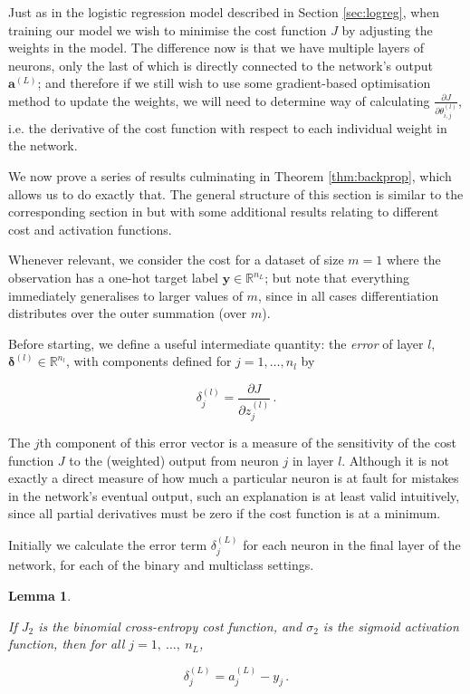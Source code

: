 \documentclass{article}[11pt]
\newtheorem{lemma}{Lemma}
\begin{document}
        Just as in the logistic regression model described in Section \ref{sec:logreg}, when training our model we wish to minimise the cost function $J$ by adjusting the weights in the model. The difference now is that we have multiple layers of neurons, only the last of which is directly connected to the network's output $\mathbf{a}^{(L)}$; and therefore if we still wish to use some gradient-based optimisation method to update the weights, we will need to determine way of calculating $\frac{\partial J}{\partial \theta^{(l)}_{i,j}}$, i.e. the derivative of the cost function with respect to each individual weight in the network.
        
        We now prove a series of results culminating in Theorem \ref{thm:backprop}, which allows us to do exactly that. The general structure of this section is similar to the corresponding section in \cite{higham} but with some additional results relating to different cost and activation functions.
        
        Whenever relevant, we consider the cost for a dataset of size $m = 1$ where the observation has a one-hot target label $\mathbf{y} \in \mathbb{R}^{n_L}$; but note that everything immediately generalises to larger values of $m$, since in all cases differentiation distributes over the outer summation (over $m$).
        
        Before starting, we define a useful intermediate quantity: the \textit{error} of layer $l$, $\boldsymbol{\delta}^{(l)} \in \mathbb{R}^{n_l}$, with components defined for $j = 1, \ldots, n_l$ by
        
        $$
        \delta^{(l)}_j = \frac{\partial J}{\partial z^{(l)}_j} \,.
        $$
        
        The $j$th component of this error vector is a measure of the sensitivity of the cost function $J$ to the (weighted) output from neuron $j$ in layer $l$. Although it is not exactly a direct measure of how much a particular neuron is at fault for mistakes in the network's eventual output, such an explanation is at least valid intuitively, since all partial derivatives must be zero if the cost function is at a minimum.
        
        Initially we calculate the error term $\delta^{(L)}_j$ for each neuron in the final layer of the network, for each of the binary and multiclass settings.
        
        
        \begin{lemma} \label{thm:init_sigmoid}
            
            If $J_2$ is the binomial cross-entropy cost function, and $\sigma_2$ is the sigmoid activation function, then for all $j = 1, \ \ldots, \ n_L$,
            
            $$
            \delta^{(L)}_j = a^{(L)}_j - y_j \,.
            $$
            
        \end{lemma}
        
\end{document}
